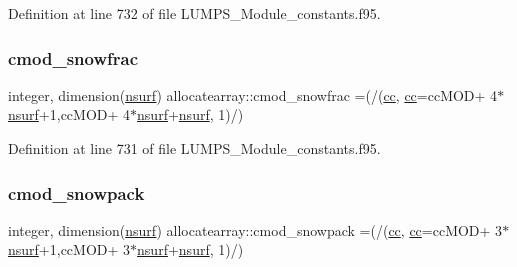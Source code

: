 Definition at line 732 of file L\+U\+M\+P\+S\+\_\+\+Module\+\_\+constants.\+f95.

\mbox{\label{namespaceallocatearray_a6e9e5b824a22feef38fdf8f241394d5e}} 
\subsubsection{\texorpdfstring{cmod\+\_\+snowfrac}{cmod\_snowfrac}}
{\footnotesize\ttfamily integer, dimension(\hyperlink{namespaceallocatearray_acd22f92a06f7e9a2a91426b3dc99fdb0}{nsurf}) allocatearray\+::cmod\+\_\+snowfrac =(/(\hyperlink{namespaceallocatearray_ac863c81704eb507dee10f5e10741e10c}{cc}, \hyperlink{namespaceallocatearray_ac863c81704eb507dee10f5e10741e10c}{cc}=cc\+M\+OD+ 4$\ast$\hyperlink{namespaceallocatearray_acd22f92a06f7e9a2a91426b3dc99fdb0}{nsurf}+1,cc\+M\+OD+ 4$\ast$\hyperlink{namespaceallocatearray_acd22f92a06f7e9a2a91426b3dc99fdb0}{nsurf}+\hyperlink{namespaceallocatearray_acd22f92a06f7e9a2a91426b3dc99fdb0}{nsurf}, 1)/)}



Definition at line 731 of file L\+U\+M\+P\+S\+\_\+\+Module\+\_\+constants.\+f95.

\mbox{\label{namespaceallocatearray_aa3c37a930996b3a000e908072c505001}} 
\subsubsection{\texorpdfstring{cmod\+\_\+snowpack}{cmod\_snowpack}}
{\footnotesize\ttfamily integer, dimension(\hyperlink{namespaceallocatearray_acd22f92a06f7e9a2a91426b3dc99fdb0}{nsurf}) allocatearray\+::cmod\+\_\+snowpack =(/(\hyperlink{namespaceallocatearray_ac863c81704eb507dee10f5e10741e10c}{cc}, \hyperlink{namespaceallocatearray_ac863c81704eb507dee10f5e10741e10c}{cc}=cc\+M\+OD+ 3$\ast$\hyperlink{namespaceallocatearray_acd22f92a06f7e9a2a91426b3dc99fdb0}{nsurf}+1,cc\+M\+OD+ 3$\ast$\hyperlink{namespaceallocatearray_acd22f92a06f7e9a2a91426b3dc99fdb0}{nsurf}+\hyperlink{namespaceallocatearray_acd22f92a06f7e9a2a91426b3dc99fdb0}{nsurf}, 1)/)}



